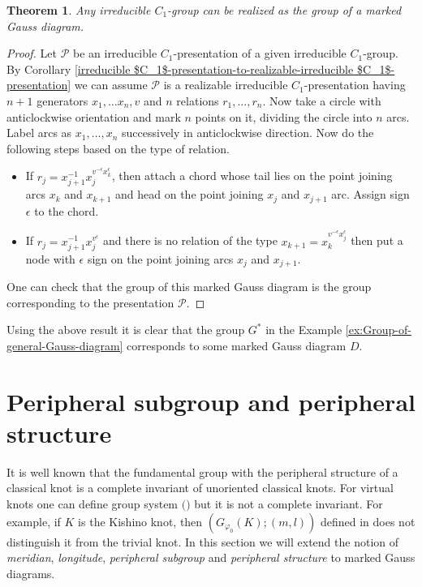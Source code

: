 \documentclass[11 pt, reqno]{amsart}
\newtheorem{theorem}{Theorem}[section]
\theoremstyle{definition}
\numberwithin{equation}{subsection}
\begin{document}
\begin{theorem}\label{RealizationOfirreducible $C_1$-presentation}
Any irreducible $C_1$-group can be realized as the group of a marked Gauss diagram.
\end{theorem}
\begin{proof}
Let $\mathcal{P}$ be an irreducible $C_1$-presentation of a given irreducible $C_1$-group. By Corollary \ref{irreducible $C_1$-presentation-to-realizable-irreducible $C_1$-presentation} we can assume $\mathcal{P}$ is a realizable irreducible $C_1$-presentation having $n+1$ generators $x_1, \ldots x_n, v$ and $n$ relations $r_1, \ldots, r_n$. Now take a circle with anticlockwise orientation and mark $n$ points on it, dividing the circle into $n$ arcs. Label arcs as $x_1, \ldots, x_n$ successively in anticlockwise direction. Now do the following steps based on the type of relation.
\begin{itemize}
\item If $r_j = x_{j+1} ^{-1} x_j ^{v^{-\epsilon} x_k ^{\epsilon}}$, then attach a chord whose tail lies on the point joining arcs $x_k$ and $x_{k+1}$ and head on the point joining $x_j$ and $x_{j+1}$ arc. Assign sign $\epsilon$ to the chord.
\item If $r_j = x_{j+1}^{-1} x_j ^{v^{\epsilon}}$ and there is no relation of the type $x_{k+1}=x_k^{v^{-\epsilon} x_j^{\epsilon}}$ then put a node with $\epsilon$ sign on the point joining arcs $x_j$ and $x_{j+1}$.
\end{itemize}
One can check that the group of this marked Gauss diagram is the group corresponding to the presentation $\mathcal{P}$.
\end{proof}

Using the above result it is clear that the group $G^*$ in the Example \ref{ex:Group-of-general-Gauss-diagram} corresponds to some marked Gauss diagram $D$.

\section{Peripheral subgroup and peripheral structure}\label{S: Peripheral subgroup and peripheral structure}
It is well known that the fundamental group with the peripheral structure of a classical knot is a complete invariant of unoriented classical knots. For virtual knots one can define group system $($\cite{Kauffman-1, GPV-1, Kim-1, BB-1}$)$ but it is not a complete invariant. For example, if $K$ is the Kishino knot, then $(G_{\varphi_0}(K); (m,l))$ defined in \cite{BB-1} does not distinguish it from the trivial knot. In this section we will extend the notion of \textit{meridian}, \textit{longitude}, \textit{peripheral subgroup} and \textit{peripheral structure} to marked Gauss diagrams.
\par
\end{document}
